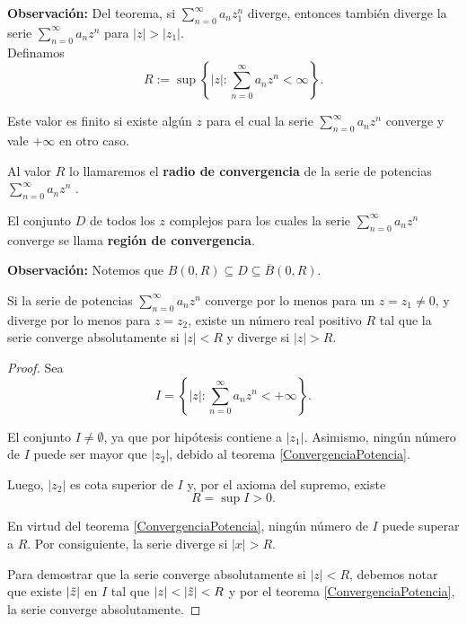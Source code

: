 \textbf{Observación:} Del teorema, si $\sum\limits_{n=0}^{\infty} a_n z_1^n$ diverge, entonces también diverge la serie $\sum\limits_{n=0}^{\infty} a_n z^n$ para $|z| > |z_1|$.
\\

Definamos 
$$R := \sup \left\{|z| : \sum_{n=0}^{\infty} a_n z^n < \infty  \right\}.$$

Este valor es finito si existe algún $z$ para el cual la serie $\sum\limits_{n=0}^{\infty} a_n z^n$ converge  y vale $+\infty$ en otro caso.

\begin{defi}
Al valor $R$ lo llamaremos el \textbf{radio de convergencia} de la serie de potencias $\sum\limits_{n=0}^{\infty} a_n z^n$ .
\end{defi}

\begin{defi}
El conjunto $D$ de todos los $z$ complejos para los cuales la serie $\sum\limits_{n=0}^{\infty} a_n z^n$ converge se llama \textbf{región de convergencia}. 
\end{defi}

\textbf{Observación:} Notemos que $B(0,R) \subseteq D \subseteq \overline{B}(0,R)$.

\begin{teorema}
Si la serie de potencias $\sum\limits_{n=0}^{\infty} a_n z^n$ converge por lo menos para un $z = z_1 \neq 0$, y diverge por lo menos para $z = z_2$, existe un número real positivo $R$ tal que la serie converge absolutamente si $|z| < R$ y diverge si $|z| > R$.
\end{teorema}

\begin{proof}
Sea 
$$I = \left\{ |z| : \sum_{n=0}^{\infty} a_n z^n < + \infty  \right\}.$$

El conjunto $I \neq \emptyset$, ya que por hipótesis contiene a $|z_1|$. Asimismo, ningún número de $I$ puede ser mayor que $|z_2|$, debido al teorema \ref{ConvergenciaPotencia}.

Luego, $|z_2|$ es cota superior de $I$ y, por el axioma del supremo, existe
$$R = \sup I > 0.$$

En virtud del teorema \ref{ConvergenciaPotencia}, ningún número de $I$ puede superar a $R$. Por consiguiente, la serie diverge si $|x| > R$.

Para demostrar que la serie converge absolutamente si $|z| < R$, debemos notar que existe $|\Tilde{z}|$ en $I$ tal que $|z| < |\Tilde{z}| < R$ y por el teorema \ref{ConvergenciaPotencia}, la serie converge absolutamente.

\end{proof}

